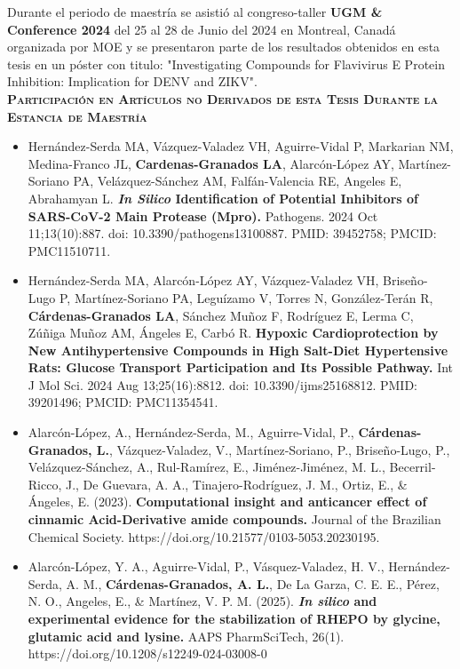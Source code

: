\begin{center}
	Durante el periodo de maestría se asistió al congreso-taller \textbf{UGM \& Conference 2024} del 25 al 28 de Junio del 2024 en Montreal, Canadá organizada por \ac{MOE} y se presentaron parte de los resultados obtenidos en esta tesis en un póster con titulo: "Investigating Compounds for Flavivirus E Protein Inhibition: Implication for DENV and ZIKV".\\[1.5CM]	
	\textbf{\textsc{Participación en Artículos no Derivados de esta Tesis Durante la Estancia de Maestría }}\\[0.6cm]
	\begin{itemize}
		\item Hernández-Serda MA, Vázquez-Valadez VH, Aguirre-Vidal P, Markarian NM, Medina-Franco JL, \textbf{Cardenas-Granados LA}, Alarcón-López AY, Martínez-Soriano PA, Velázquez-Sánchez AM, Falfán-Valencia RE, Angeles E, Abrahamyan L. \textbf{\textit{In Silico} Identification of Potential Inhibitors of SARS-CoV-2 Main Protease (Mpro).} Pathogens. 2024 Oct 11;13(10):887. doi: 10.3390/pathogens13100887. PMID: 39452758; PMCID: PMC11510711.
		\item Hernández-Serda MA, Alarcón-López AY, Vázquez-Valadez VH, Briseño-Lugo P, Martínez-Soriano PA, Leguízamo V, Torres N, González-Terán R, \textbf{Cárdenas-Granados LA}, Sánchez Muñoz F, Rodríguez E, Lerma C, Zúñiga Muñoz AM, Ángeles E, Carbó R. \textbf{Hypoxic Cardioprotection by New Antihypertensive Compounds in High Salt-Diet Hypertensive Rats: Glucose Transport Participation and Its Possible Pathway.} Int J Mol Sci. 2024 Aug 13;25(16):8812. doi: 10.3390/ijms25168812. PMID: 39201496; PMCID: PMC11354541.
		\item Alarcón-López, A., Hernández-Serda, M., Aguirre-Vidal, P., \textbf{Cárdenas-Granados, L.}, Vázquez-Valadez, V., Martínez‑Soriano, P., Briseño-Lugo, P., Velázquez-Sánchez, A., Rul-Ramírez, E., Jiménez-Jiménez, M. L., Becerril-Ricco, J., De Guevara, A. A., Tinajero-Rodríguez, J. M., Ortiz, E., \& Ángeles, E. (2023). \textbf{Computational insight and anticancer effect of cinnamic Acid-Derivative amide compounds.} Journal of the Brazilian Chemical Society. https://doi.org/10.21577/0103-5053.20230195.
		\item Alarcón-López, Y. A., Aguirre-Vidal, P., Vásquez-Valadez, H. V., Hernández-Serda, A. M., \textbf{Cárdenas-Granados, A. L.}, De La Garza, C. E. E., Pérez, N. O., Angeles, E., \& Martínez, V. P. M. (2025).\textbf{ \textit{In silico} and experimental evidence for the stabilization of RHEPO by glycine, glutamic acid and lysine.} AAPS PharmSciTech, 26(1). https://doi.org/10.1208/s12249-024-03008-0
		
	\end{itemize}
	
\end{center}
\restoregeometry